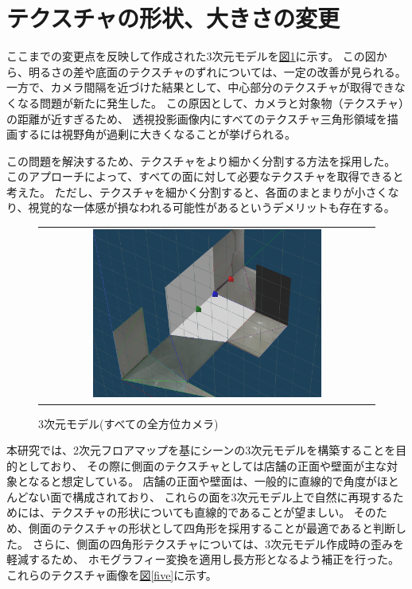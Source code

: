 \documentclass[]{jarticle}          %
\begin{document}
\section{テクスチャの形状、大きさの変更}
ここまでの変更点を反映して作成された3次元モデルを\hyperref[four]{図\ref{four}}に示す。
この図から、明るさの差や底面のテクスチャのずれについては、一定の改善が見られる。
一方で、カメラ間隔を近づけた結果として、中心部分のテクスチャが取得できなくなる問題が新たに発生した。
この原因として、カメラと対象物（テクスチャ）の距離が近すぎるため、
透視投影画像内にすべてのテクスチャ三角形領域を描画するには視野角が過剰に大きくなることが挙げられる。

この問題を解決するため、テクスチャをより細かく分割する方法を採用した。
このアプローチによって、すべての面に対して必要なテクスチャを取得できると考えた。
ただし、テクスチャを細かく分割すると、各面のまとまりが小さくなり、視覚的な一体感が損なわれる可能性があるというデメリットも存在する。

\begin{figure}[H]
  \begin{center}
    \begin{tabular}{c}
      \includegraphics[width=0.7\textwidth]{figures/1.png}
    \end{tabular}
  \end{center}
  \caption{3次元モデル(すべての全方位カメラ)}
  \label{four}
\end{figure}

本研究では、2次元フロアマップを基にシーンの3次元モデルを構築することを目的としており、
その際に側面のテクスチャとしては店舗の正面や壁面が主な対象となると想定している。
店舗の正面や壁面は、一般的に直線的で角度がほとんどない面で構成されており、
これらの面を3次元モデル上で自然に再現するためには、テクスチャの形状についても直線的であることが望ましい。
そのため、側面のテクスチャの形状として四角形を採用することが最適であると判断した。
さらに、側面の四角形テクスチャについては、3次元モデル作成時の歪みを軽減するため、
ホモグラフィー変換を適用し長方形となるよう補正を行った。
これらのテクスチャ画像を\hyperref[five]{図\ref{five}}に示す。
\end{document}
